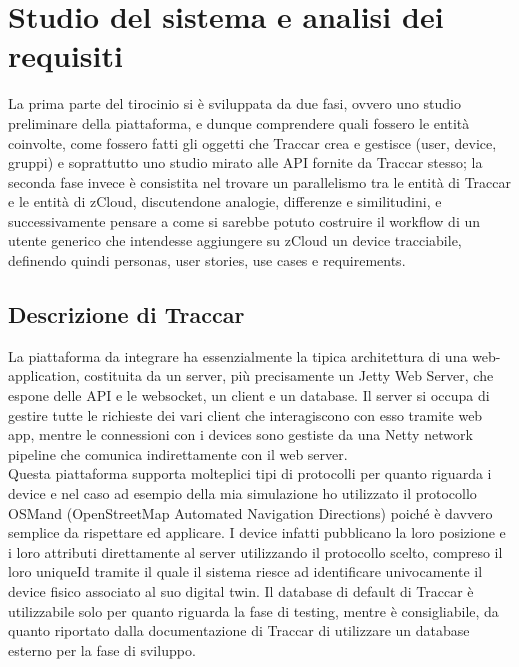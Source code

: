 \documentclass[a4paper,titlepage,12pt]{report}
\begin{document}
{\chapter{
Studio del sistema e analisi dei requisiti}
La prima parte del tirocinio si è sviluppata da due fasi, ovvero uno studio preliminare della piattaforma, e dunque comprendere quali fossero le entità coinvolte, come fossero fatti gli oggetti che Traccar crea e gestisce (user, device, gruppi) e soprattutto uno studio mirato alle API fornite da Traccar stesso; la seconda fase invece è consistita nel trovare un parallelismo tra le entità di Traccar e le entità di zCloud, discutendone analogie, differenze e similitudini, e successivamente pensare a come si sarebbe potuto costruire il workflow di un utente generico che intendesse aggiungere su zCloud un device tracciabile, definendo quindi personas, user stories, use cases e requirements.

\section{
Descrizione di Traccar}
La piattaforma da integrare ha essenzialmente la tipica architettura di una web-application, costituita da un server, più precisamente un Jetty Web Server, che espone delle API e le websocket, un client e un database. Il server si occupa di gestire tutte le richieste dei vari client che interagiscono con esso tramite web app, mentre le connessioni con i devices sono gestiste da una Netty network pipeline che comunica indirettamente con il web server.\\
Questa piattaforma supporta molteplici tipi di protocolli per quanto riguarda i device e nel caso ad esempio della mia simulazione ho utilizzato il protocollo OSMand (OpenStreetMap Automated Navigation Directions) poiché è davvero semplice da rispettare ed applicare. I device infatti pubblicano la loro posizione e i loro attributi direttamente al server utilizzando il protocollo scelto, compreso il loro uniqueId tramite il quale il sistema riesce ad identificare univocamente il device fisico associato al suo digital twin. Il database di default di Traccar è utilizzabile solo per quanto riguarda la fase di testing, mentre è consigliabile, da quanto riportato dalla documentazione di Traccar di utilizzare un database esterno per la fase di sviluppo.    


}
\end{document}
